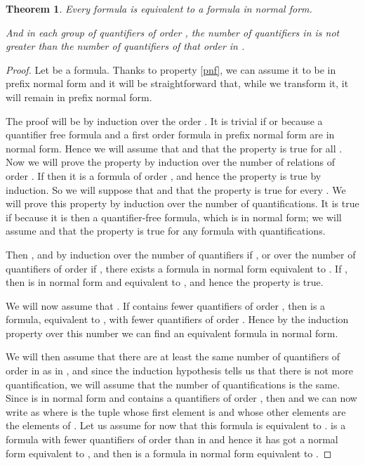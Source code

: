 \documentclass[a4paper,12pt]{article}
\newtheorem{theorem}{Theorem}[section]
\theoremstyle{definition}
\begin{document}
\begin{theorem}
  Every formula  is equivalent to a formula
   in normal form. 

  And in each group of quantifiers of order , the number of
  quantifiers in  is not greater than the number of quantifiers
  of that order in .
\end{theorem}
\begin{proof}
  Let  be a formula. Thanks to property \ref{pnf}, we can assume
  it to be in prefix normal form and it will be straightforward that,
  while we transform it, it will remain in prefix normal form.

  The proof will be by induction over the order . It is trivial if
   or  because a quantifier free formula and a first order
  formula in prefix normal form are in normal form. Hence we will
  assume that  and that the property is true for all . Now
  we will prove the property by induction over the number  of
  relations of order . If  then it is a formula of order
  , and hence the property is true by induction. So we will
  suppose that  and that the property is true for every . We
  will prove this property by induction over the number  of
  quantifications. It is true if  because it is then a
  quantifier-free formula, which is in normal form; we will assume
   and that the property is true for any formula with 
  quantifications.

  Then , and by induction over the number of
  quantifiers if , or over the number of quantifiers of order 
  if , there exists a formula  in normal form equivalent
  to  . If , then  is in normal form
  and equivalent to , and hence the property is true.

  We will now assume that . If  contains fewer quantifiers
  of order , then  is a formula, equivalent
  to , with fewer quantifiers of order . Hence by the
  induction property over this number we can find an equivalent
  formula in normal form.

  We will then assume that there are at least the same number of
  quantifiers of order  in  as in , and since the
  induction hypothesis tells us that there is not more quantification,
  we will assume that the number of quantifications is the same. Since
   is in normal form and contains a quantifiers of order ,
  then  and we can now write  as
   where  is the tuple whose
  first element is  and whose other elements are the elements of
  . Let us assume for now that this formula is equivalent to
  .  is a formula with fewer quantifiers
  of order  than in  and hence it has got a normal form
   equivalent to , and then  is a formula in normal form equivalent to .


\end{proof}
\end{document}

